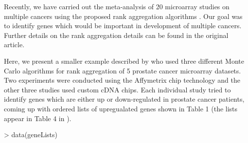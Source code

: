 \documentclass[11pt]{article}
\begin{document}
Recently, we have carried out the meta-analysis of 20 microarray studies on
multiple cancers using the proposed rank aggregation algorithms \cite{Pih08}. 
Our goal was to identify genes which would be important in
development of multiple cancers. Further details on the rank aggregation details
can be found in the original article. 

Here, we present a smaller example described by \cite{Dec06} who used three different
Monte Carlo algorithms for rank aggregation of 5 prostate cancer microarray datasets.
Two experiments were conducted using the Affymetrix chip technology and the other three
studies used custom cDNA chips. Each individual study tried to identify genes which are
either up or down-regulated in prostate cancer patients, coming up with ordered lists of
upregualated genes shown in Table 1 (the lists appear in Table 4 in \cite{Dec06}).

\begin{Schunk}
\begin{Sinput}
> data(geneLists)
\end{Sinput}
\end{Schunk}
\end{document}
